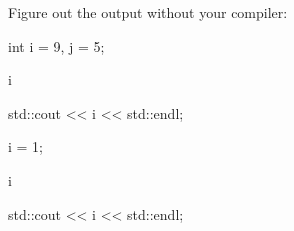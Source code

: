Figure out the output without your compiler:

\begin{console}

int i = 9, j = 5;



i %

std::cout << i << std::endl;



i = 1;

i %

std::cout << i << std::endl;

\end{console}

